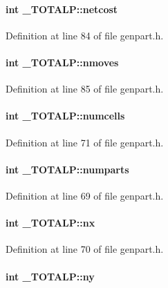\paragraph{\setlength{\rightskip}{0pt plus 5cm}int \_\-TOTALP::netcost}\hfill



Definition at line 84 of file genpart.h.\label{_TOTALP_m16}
\paragraph{\setlength{\rightskip}{0pt plus 5cm}int \_\-TOTALP::nmoves}\hfill



Definition at line 85 of file genpart.h.\label{_TOTALP_m3}
\paragraph{\setlength{\rightskip}{0pt plus 5cm}int \_\-TOTALP::numcells}\hfill



Definition at line 71 of file genpart.h.\label{_TOTALP_m0}
\paragraph{\setlength{\rightskip}{0pt plus 5cm}int \_\-TOTALP::numparts}\hfill



Definition at line 69 of file genpart.h.\label{_TOTALP_m1}
\paragraph{\setlength{\rightskip}{0pt plus 5cm}int \_\-TOTALP::nx}\hfill



Definition at line 70 of file genpart.h.\label{_TOTALP_m2}
\paragraph{\setlength{\rightskip}{0pt plus 5cm}int \_\-TOTALP::ny}\hfill



